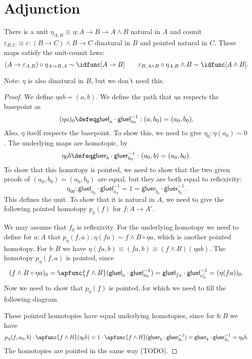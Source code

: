 \documentclass{article}
\newcommand{\pmap}{\to}
\newcommand{\smsh}{\wedge}
\renewcommand{\epsilon}{\varepsilon}
\newcommand{\tr}{\cdot}
\renewcommand{\o}{\ensuremath{\circ}}
\newcommand{\gluel}{\mathsf{gluel}}
\newcommand{\gluer}{\mathsf{gluer}}
\newcommand{\sy}{^{-1}}
\begin{document}
\section{Adjunction}

\begin{lem}\label{lem:unit-counit}
  There is a unit $\eta_{A,B}\equiv\eta:A\pmap B\pmap A\smsh B$ natural in $A$ and counit
  $\epsilon_{B,C}\equiv\epsilon : (B\pmap C)\smsh B \pmap C$ dinatural in $B$ and pointed natural in $C$.
  These maps satisfy the unit-counit laws:
  $$(A\to\epsilon_{A,B})\o \eta_{A\to B,A}\sim \idfunc[A\to B]\qquad
  \epsilon_{B,A\smsh B}\o \eta_{A,B}\smsh B\sim\idfunc[A\smsh B].$$
\end{lem}
Note: $\eta$ is also dinatural in $B$, but we don't need this.
\begin{proof}
  We define $\eta ab=(a,b)$. We define the path that $\eta a$ respects the basepoint as
  $$(\eta a)_0\defeq\gluel_a\tr\gluel_{a_0}\sy:(a,b_0)=(a_0,b_0).$$ Also, $\eta$ itself respects the basepoint. To show this, we need to give $\eta_0:\eta (a_0)\sim 0$. The underlying maps are homotopic, by $$\eta_0b\defeq\gluer_b\cdot\gluer_{b_0}\sy:(a_0,b)=(a_0,b_0).$$ To show that
  this homotopy is pointed, we need to show that the two given proofs of $(a_0,b_0)=(a_0,b_0)$ are
  equal, but they are both equal to reflexivity:
  $$\eta_{00}:\gluel_{a_0}\tr\gluel_{a_0}\sy=1=\gluer_{b_0}\tr\gluer_{b_0}\sy.$$
  This defines the unit. To show that it is natural in $A$, we need to give the following pointed homotopy $p_\eta(f)$ for $f:A\to A'$.
  \begin{center}
  \end{center}
  We may assume that $f_0$ is reflexivity. For the underlying homotopy we need to define for $a:A$ that $p_\eta(f,a):\eta(fa)\sim f\smsh B \circ \eta a$, which is another pointed homotopy. For $b:B$ we have $\eta(fa,b)\equiv(fa,b)\equiv(f\smsh B)(\eta ab).$
  The homotopy $p_\eta(f,a)$ is pointed, since $$(f\smsh B \circ \eta a)_0=\apfunc{f\smsh B}(\gluel_a\cdot\gluel_{a_0}\sy)=\gluel_{fa}\cdot\gluel_{a_0'}\sy=(\eta(fa))_0.$$
  Now we need to show that $p_\eta(f)$ is pointed, for which we need to fill the following diagram.
  \begin{center}
  \end{center}
  These pointed homotopies have equal underlying homotopies, since for $b:B$ we have 
  $$p_\eta(f,a_0,b)\cdot\apfunc{f\smsh B}(\eta_0 b)=1\cdot\apfunc{f\smsh B}(\gluer_b\cdot\gluer_{b_0}\sy)=\gluer_{b}\cdot\gluer_{b_0}\sy=\eta_0b.$$
  The homotopies are pointed in the same way (TODO).


\end{proof}
\end{document}
